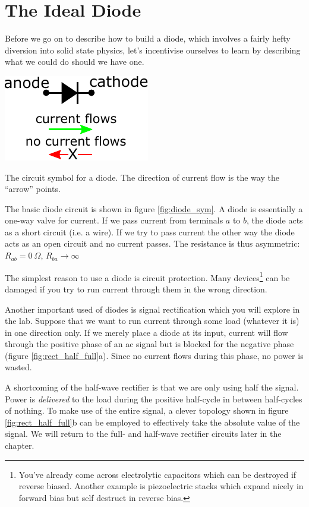 \documentclass{tufte-book}
\begin{document}
\section{The Ideal Diode}
Before we go on to describe how to build a diode, which involves a fairly hefty diversion into solid state physics, let's incentivise ourselves to learn by describing what we could do should we have one. 

\begin{marginfigure}%
  \includegraphics[]{diodecurrentflow}
  \caption{The circuit symbol for a diode. The direction of current flow is the way the ``arrow'' points.}
  \label{fig:diode_sym}
\end{marginfigure}

The basic diode circuit is shown in figure \ref{fig:diode_sym}. A diode is essentially a one-way valve for current. If we pass current from terminals $a$ to $b$, the diode acts as a short circuit (i.e. a wire). If we try to pass current the other way the diode acts as an open circuit and no current passes. The resistance is thus asymmetric: $R_{ab} = 0~\Omega$, $R_{ba} \rightarrow \infty$

The simplest reason to use a diode is circuit protection. Many devices\footnote{You've already come across electrolytic capacitors which can be destroyed if reverse biased. Another example is piezoelectric stacks which expand nicely in forward bias but self destruct in reverse bias.} can be damaged if you try to run current through them in the wrong direction. 

Another important used of diodes is signal rectification which you will explore in the lab. Suppose that we want to run current through some load (whatever it is) in one direction only. If we merely place a diode at its input, current will flow through the positive phase of an ac signal but is blocked for the negative phase (figure \ref{fig:rect_half_full}a). Since no current flows during this phase, no power is wasted. 

A shortcoming of the half-wave rectifier is that we are only using half the signal. Power is \textit{delivered} to the load during the positive half-cycle in between half-cycles of nothing. To make use of the entire signal, a clever topology shown in figure \ref{fig:rect_half_full}b can be employed to effectively take the absolute value of the signal. We will return to the full- and half-wave rectifier circuits later in the chapter.
\end{document}
